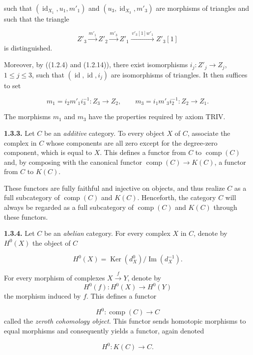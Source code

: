\clearpage
{}%
\begingroup
\small
\setlength{\emergencystretch}{1.5em}%
\setlength{\abovedisplayskip}{4pt plus 2pt minus 2pt}%
\setlength{\belowdisplayskip}{4pt plus 2pt minus 2pt}%

\noindent such that
$(\operatorname{id}_{X_1},u_1,m'_1)$ and
$(u_3,\operatorname{id}_{X_3},m'_3)$ are morphisms of triangles and such
that the triangle

\[
  Z'_3\xrightarrow{m'_1}Z'_2\xrightarrow{m'_3}Z'_1
  \xrightarrow{\,v'_3[1]w'_1\,}Z'_3[1]
\]
\noindent is distinguished.

Moreover, by ((1.2.4) and (1.2.14)), there exist isomorphisms
$i_j\colon Z'_j\longrightarrow Z_j$, $1\leq j\leq 3$, such that
$(\operatorname{id},\operatorname{id},i_j)$ are isomorphisms of triangles.
It then suffices to set

\[
  m_1=i_2m'_1i_3^{-1}\colon Z_3\longrightarrow Z_2,
  \qquad
  m_3=i_1m'_3i_2^{-1}\colon Z_2\longrightarrow Z_1.
\]

The morphisms $m_1$ and $m_3$ have the properties required by axiom TRIV.

\medskip
\noindent\textbf{1.3.3.}\quad
Let $C$ be an \emph{additive} category. To every object $X$ of $C$, associate
the complex in $C$ whose components are all zero except for the degree-zero
component, which is equal to $X$. This defines a functor from $C$ to
$\operatorname{comp}(C)$ and, by composing with the canonical functor
$\operatorname{comp}(C)\longrightarrow K(C)$, a functor from $C$ to $K(C)$.

These functors are fully faithful and injective on objects, and thus realize
$C$ as a full subcategory of $\operatorname{comp}(C)$ and $K(C)$. Henceforth,
the category $C$ will always be regarded as a full subcategory of
$\operatorname{comp}(C)$ and $K(C)$ through these functors.

\medskip
\noindent\textbf{1.3.4.}\quad
Let $C$ be an \emph{abelian} category. For every complex $X$ in $C$, denote
by $H^0(X)$ the object of $C$

\[
  H^0(X)=\operatorname{Ker}(d_X^0)/\operatorname{Im}(d_X^{-1}).
  \tag{1.3.4.1}
\]

For every morphism of complexes $X\xrightarrow{f}Y$, denote by
\[
  H^0(f)\colon H^0(X)\longrightarrow H^0(Y)
\]
\noindent the morphism induced by $f$. This defines a functor

\[
  H^0\colon\operatorname{comp}(C)\longrightarrow C
\]
\noindent called the \emph{zeroth cohomology object}. This functor sends
homotopic morphisms to equal morphisms and consequently yields a functor,
again denoted

\[
  H^0\colon K(C)\longrightarrow C.
\]
\endgroup

